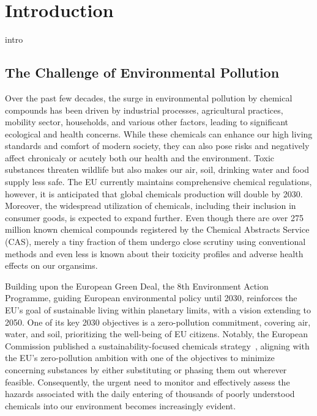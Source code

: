 \newcommand{\package}{\emph}

\chapter{Introduction}\label{chap:introduction}
intro

\section{The Challenge of Environmental Pollution}

Over the past few decades, the surge in environmental pollution by chemical compounds has been driven by industrial processes, agricultural practices, mobility sector, households, and various other factors, leading to significant ecological and health concerns.
While these chemicals can enhance our high living standards and comfort of modern society, they can also pose risks and negatively affect chronicaly or acutely both our health and the environment. Toxic substances threaten wildlife but also makes our air, soil, drinking water and food supply less safe. 
The EU currently maintains comprehensive chemical regulations, however, it is anticipated that global chemicals production will double by 2030. Moreover, the widespread utilization of chemicals, including their inclusion in consumer goods, is expected to expand further.
Even though there are over 275 million known chemical compounds registered by the Chemical Abstracts Service (CAS), merely a tiny fraction of them undergo close scrutiny using conventional methods and even less is known about their toxicity profiles and adverse health effects on our organsims.

Building upon the European Green Deal, the 8th Environment Action Programme, guiding European environmental policy until 2030, reinforces the EU's goal of sustainable living within planetary limits, with a vision extending to 2050. One of its key 2030 objectives is a zero-pollution commitment, covering air, water, and soil, prioritizing the well-being of EU citizens. Notably, the European Commission published a sustainability-focused chemicals strategy~\cite{arturi}, aligning with the EU's zero-pollution ambition with one of the objectives to minimize concerning substances by either substituting or phasing them out wherever feasible. 
Consequently, the urgent need to monitor and effectively assess the hazards associated with the daily entering of thousands of poorly understood chemicals into our environment becomes increasingly evident.

